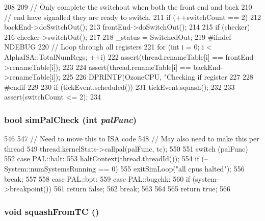 \begin{DoxyCode}
208 {
209     // Only complete the switchout when both the front end and back
210     // end have signalled they are ready to switch.
211     if (++switchCount == 2) {
212         backEnd->doSwitchOut();
213         frontEnd->doSwitchOut();
214 
215         if (checker)
216             checker->switchOut();
217 
218         _status = SwitchedOut;
219 #ifndef NDEBUG
220         // Loop through all registers
221         for (int i = 0; i < AlphaISA::TotalNumRegs; ++i) {
222             assert(thread.renameTable[i] == frontEnd->renameTable[i]);
223 
224             assert(thread.renameTable[i] == backEnd->renameTable[i]);
225 
226             DPRINTF(OzoneCPU, "Checking if register %
227         }
228 #endif
229 
230         if (tickEvent.scheduled())
231             tickEvent.squash();
232     }
233     assert(switchCount <= 2);
234 }
\end{DoxyCode}
\hypertarget{classOzoneCPU_a461205960be9d52e9beda48a77e9c600}{
\subsubsection[{simPalCheck}]{\setlength{\rightskip}{0pt plus 5cm}bool simPalCheck (int {\em palFunc})}}
\label{classOzoneCPU_a461205960be9d52e9beda48a77e9c600}



\begin{DoxyCode}
546 {
547     // Need to move this to ISA code
548     // May also need to make this per thread
549     thread.kernelStats->callpal(palFunc, tc);
550 
551     switch (palFunc) {
552       case PAL::halt:
553         haltContext(thread.threadId());
554         if (--System::numSystemsRunning == 0)
555             exitSimLoop("all cpus halted");
556         break;
557 
558       case PAL::bpt:
559       case PAL::bugchk:
560         if (system->breakpoint())
561             return false;
562         break;
563     }
564 
565     return true;
566 }
\end{DoxyCode}
\hypertarget{classOzoneCPU_a24cd8db837a73b879041bf33da7b2064}{
\subsubsection[{squashFromTC}]{\setlength{\rightskip}{0pt plus 5cm}void squashFromTC ()}}
\label{classOzoneCPU_a24cd8db837a73b879041bf33da7b2064}



